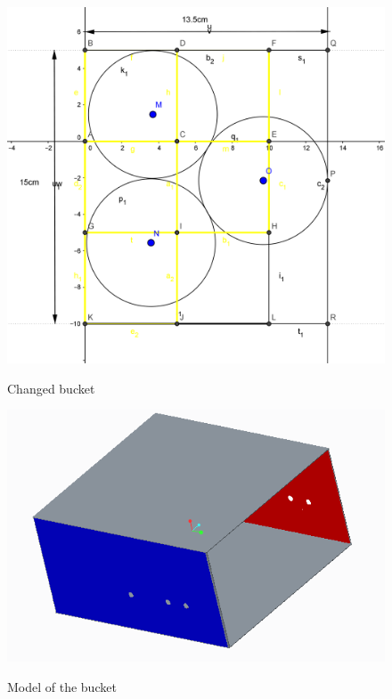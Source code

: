 \begin{itemize}
\begin{figure}[H]
\begin{minipage}[h]{0.55\linewidth}
		{\includegraphics[scale=0.15]{days_L/Lift+bucket/images/03}}
		\caption{Changed bucket}
	\end{minipage}
	\hfill
	\begin{minipage}[h]{0.55\linewidth}
		{\includegraphics[scale=0.5]{days_L/Lift+bucket/images/06}}
		\caption{Model of the bucket}
	\end{minipage}
\end{figure}


\end{itemize}
